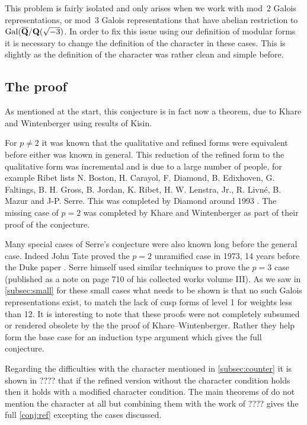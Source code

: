 \documentclass[a4paper,12pt]{article}
\begin{document}
This problem is fairly isolated and only arises when we work with mod~2 Galois representations, or mod~3 Galois representations that have abelian restriction to $\operatorname{Gal}(\overline{\mathbf{Q}}/\mathbf{Q}(\sqrt{-3})$. %
In order to fix this issue using our definition of modular forms it is necessary to change the definition of the character in these cases.
This is slightly  as the definition of the character was rather clean and simple before.


\subsection{The proof}
As mentioned at the start, this conjecture is in fact now a theorem, due to Khare and Wintenberger using results of Kisin.

For $p \ne 2$ it was known that the qualitative and refined forms were equivalent before either was known in general.
This reduction of the refined form to the qualitative form was incremental and is due to a large number of people, for example Ribet \cite{Ribet94} lists N. Boston, H. Carayol, F. Diamond, B. Edixhoven, G. Faltings, B. H. Gross, B. Jordan, K. Ribet, H. W. Lenstra, Jr., R. Livn\'e, B. Mazur and J-P. Serre.
This was completed by Diamond around 1993 \cite{Diamond}.
The missing case of $p=2$ was completed by Khare and Wintenberger as part of their proof of the conjecture.

Many special cases of Serre's conjecture were also known long before the general case.
Indeed John Tate proved the $p = 2$ unramified case in 1973, 14 years before the Duke paper \cite{Tate}.
Serre himself used similar techniques to prove the $p = 3$ case (published as a note on page 710 of his collected works volume III).
As we saw in \cref{subsec:small} for these small cases what needs to be shown is that no such Galois representations exist, to match the lack of cusp forms of level 1 for weights less than 12.
It is interesting to note that these proofs were not completely subsumed or rendered obsolete by the the proof of Khare--Wintenberger.
Rather they help form the base case for an induction type argument which gives the full conjecture.

Regarding the difficulties with the character mentioned in  \cref{subsec:counter} it is shown in ???? that if the refined version without the character condition holds then it holds with a modified character condition.
The main theorems of \cite{KWI,KWII} do not mention the character at all but combining them with the work of ???? gives the full \cref{conj:ref} excepting the cases discussed.
\end{document}
